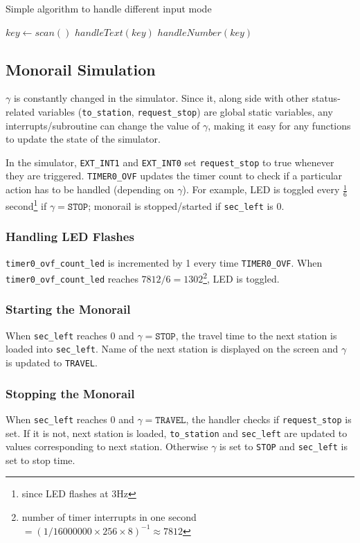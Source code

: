 \documentclass[a4paper,12pt]{article}
\begin{document}
\begin{algorithm}
\label{alg:input-mode}
\caption{Simple algorithm to handle different input mode}
\begin{algorithmic}
\STATE $key\gets scan()$
    \STATE $handleText(key)$
\ELSE
    \STATE $handleNumber(key)$
\ENDIF
\end{algorithmic}
\end{algorithm}

\subsection{Monorail Simulation}
$\gamma$ is constantly changed in the simulator. Since it, along side with other status-related variables (\texttt{to\_station}, \texttt{request\_stop}) are global static variables, any interrupts/subroutine can change the value of $\gamma$, making it easy for any functions to update the state of the simulator.

In the simulator, \texttt{EXT\_INT1} and \texttt{EXT\_INT0} set \texttt{request\_stop} to true whenever they are triggered. \texttt{TIMER0\_OVF} updates the timer count to check if a particular action has to be handled (depending on $\gamma$). For example, LED is toggled every $\frac{1}{6}$ second\footnote{since LED flashes at $3\si{\hertz}$} if $\gamma = \texttt{STOP}$; monorail is stopped/started if \texttt{sec\_left} is 0.

\subsubsection{Handling LED Flashes}
\texttt{timer0\_ovf\_count\_led} is incremented by 1 every time \texttt{TIMER0\_OVF}. When \texttt{timer0\_ovf\_count\_led} reaches $7812 / 6 = 1302$\footnote{number of timer interrupts in one second $= (1/16000000 \times 256 \times 8)^{-1}\approx 7812$}, LED is toggled.

\subsubsection{Starting the Monorail}
When \texttt{sec\_left} reaches 0 and $\gamma = \texttt{STOP}$, the travel time to the next station is loaded into \texttt{sec\_left}. Name of the next station is displayed on the screen and $\gamma$ is updated to \texttt{TRAVEL}.

\subsubsection{Stopping the Monorail}
When \texttt{sec\_left} reaches 0 and $\gamma = \texttt{TRAVEL}$, the handler checks if \texttt{request\_stop} is set. If it is not, next station is loaded, \texttt{to\_station} and \texttt{sec\_left} are updated to values corresponding to next station. Otherwise $\gamma$ is set to \texttt{STOP} and \texttt{sec\_left} is set to stop time.
\end{document}
